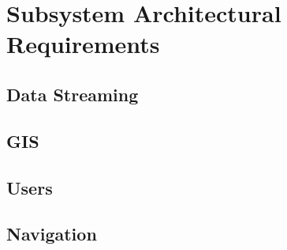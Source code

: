 \documentclass{article}
\begin{document}
\pagebreak
\section{Subsystem Architectural Requirements}
  \subsection{Data Streaming}
	
\clearpage
  \subsection{GIS}
	
\clearpage
  \subsection{Users}
	
\clearpage
  \subsection{Navigation}
	
\end{document}
